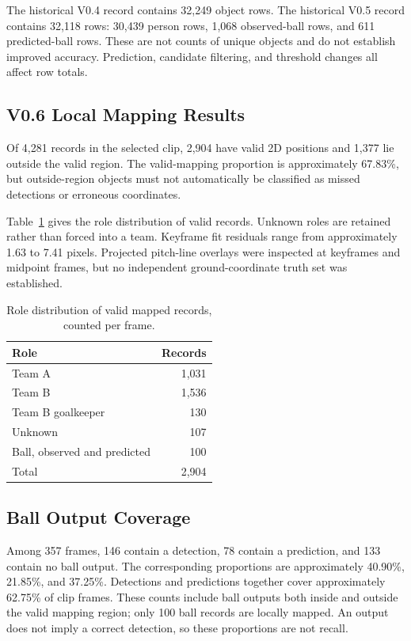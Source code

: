 \documentclass[11pt,a4paper]{article}
\begin{document}
The historical V0.4 record contains 32,249 object rows.
The historical V0.5 record contains 32,118 rows: 30,439 person rows,
1,068 observed-ball rows, and 611 predicted-ball rows.
These are not counts of unique objects and do not establish improved accuracy.
Prediction, candidate filtering, and threshold changes all affect row totals.

\subsection{V0.6 Local Mapping Results}

Of 4,281 records in the selected clip, 2,904 have valid 2D positions and
1,377 lie outside the valid region. The valid-mapping proportion is approximately
67.83\%, but outside-region objects must not automatically be classified as
missed detections or erroneous coordinates.

Table~\ref{tab:roles} gives the role distribution of valid records.
Unknown roles are retained rather than forced into a team.
Keyframe fit residuals range from approximately 1.63 to 7.41 pixels.
Projected pitch-line overlays were inspected at keyframes and midpoint frames,
but no independent ground-coordinate truth set was established.

\begin{table}[htbp]
\centering
\caption{Role distribution of valid mapped records, counted per frame.}
\label{tab:roles}
\begin{tabular}{lr}
\toprule
Role & Records\\
\midrule
Team A & 1,031\\
Team B & 1,536\\
Team B goalkeeper & 130\\
Unknown & 107\\
Ball, observed and predicted & 100\\
\midrule
Total & 2,904\\
\bottomrule
\end{tabular}
\end{table}

\subsection{Ball Output Coverage}

Among 357 frames, 146 contain a detection, 78 contain a prediction, and
133 contain no ball output. The corresponding proportions are approximately
40.90\%, 21.85\%, and 37.25\%.
Detections and predictions together cover approximately 62.75\% of clip frames.
These counts include ball outputs both inside and outside the valid mapping
region; only 100 ball records are locally mapped.
An output does not imply a correct detection, so these proportions are not recall.
\end{document}
